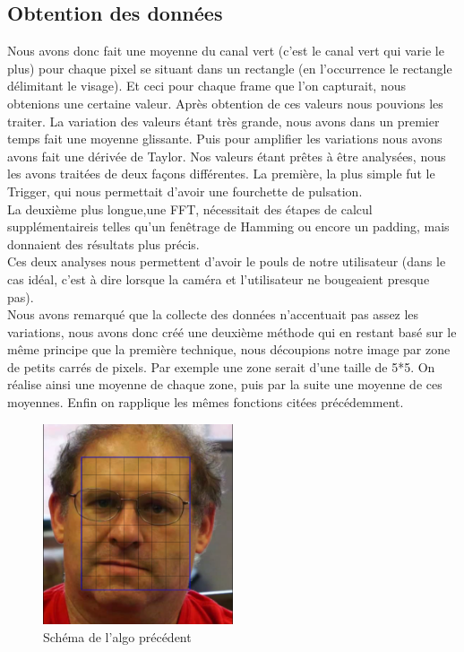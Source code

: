  \subsection{Obtention des données}
 Nous avons donc fait une moyenne du canal vert (c'est le canal vert qui varie le plus) pour chaque pixel se situant dans un rectangle (en l’occurrence le rectangle délimitant le visage).
 Et ceci pour chaque frame que l'on capturait, nous obtenions une certaine valeur.
 Après obtention de ces valeurs nous pouvions les traiter.
 La variation des valeurs étant très grande, nous avons dans un premier temps fait une moyenne glissante. Puis pour amplifier les variations nous avons avons fait une dérivée de Taylor.
 Nos valeurs étant prêtes à être analysées, nous les avons traitées de deux façons différentes.
 La première, la plus simple fut le Trigger, qui nous permettait d'avoir une fourchette de pulsation.\\ La deuxième plus longue,une FFT, nécessitait des étapes de calcul supplémentaireis telles qu'un fenêtrage de Hamming ou encore un padding, mais donnaient des résultats plus précis.
 \\
 Ces deux analyses nous permettent d'avoir le pouls de notre utilisateur (dans le cas idéal, c'est à dire lorsque la caméra et l'utilisateur ne bougeaient presque pas).
 \\

Nous avons remarqué que la collecte des données n'accentuait pas assez les variations, nous avons donc créé une deuxième méthode qui en restant basé sur le même principe que la première technique, nous découpions notre image
par zone de petits carrés de pixels. Par exemple une zone serait d'une taille de 5*5. On réalise ainsi une moyenne de chaque zone, puis par la suite une moyenne de ces moyennes. Enfin on rapplique les mêmes fonctions citées précédemment.

\begin{figure}[h!]
	\centering
	\includegraphics[width=0.5\textwidth]{data/algo-schema.png}
	\caption{Schéma de l'algo précédent}
\end{figure}


